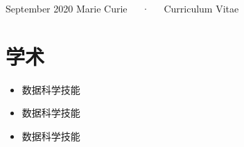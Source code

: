 \documentclass[11pt, a4paper]{awesome-cv}
\providecommand{\tightlist}{%
	\setlength{\itemsep}{0pt}\setlength{\parskip}{0pt}}
\begin{document}
\makecvheader

\makecvfooter
  {September 2020}
    {Marie Curie~~~·~~~Curriculum Vitae}
  {\thepage}





\hypertarget{ux5b66ux672f}{%
\section{学术}\label{ux5b66ux672f}}

\begin{itemize}
\tightlist
\item
  数据科学技能
\item
  数据科学技能
\item
  数据科学技能
\end{itemize}
\end{document}

